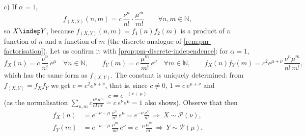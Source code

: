 \begin{example}
c) If $\alpha=1$,
\[
  f_{(X,Y)}(n,m)=c\,\frac{\nu^n}{n!}\cdot\frac{\mu^m}{m!}\qquad\forall n,m\in\mathbb N,
\]
so $X\indep Y$, because $f_{(X,Y)}(n,m)=f_1(n)f_2(m)$ is a product of a function of $n$ and a
function of $m$ (the discrete analogue of \cref{rem:pm-factorisation}). Let us confirm it with
\cref{prop:pm-discrete-independence}: for $\alpha=1$,
\[
  f_X(n)=c\,\frac{\nu^n}{n!}\,e^{\mu}\quad\forall n\in\mathbb N,\qquad
  f_Y(m)=c\,\frac{\mu^m}{m!}\,e^{\nu}\quad\forall m\in\mathbb N,\qquad
  f_X(n)f_Y(m)=c^2e^{\mu+\nu}\,\frac{\nu^n\mu^m}{n!\,m!},
\]
which has the same form as $f_{(X,Y)}$. The constant is uniquely determined: from
$f_{(X,Y)}=f_Xf_Y$ we get $c=c^2e^{\mu+\nu}$, that is, since $c\ne0$, $1=c\,e^{\mu+\nu}$ and
\[
  c=e^{-(\nu+\mu)}
\]
(as the normalisation $\sum_{n,m}c\frac{\nu^n\mu^m}{n!\,m!}=c\,e^\nu e^\mu=1$ also shows).
Observe that then
\[
\begin{aligned}
  f_X(n)&=e^{-\nu-\mu}\,\frac{\nu^n}{n!}\,e^{\mu}=e^{-\nu}\frac{\nu^n}{n!}\ \Longrightarrow\ X\sim\mathcal P(\nu),\\
  f_Y(m)&=e^{-\nu-\mu}\,\frac{\mu^m}{m!}\,e^{\nu}=e^{-\mu}\frac{\mu^m}{m!}\ \Longrightarrow\ Y\sim\mathcal P(\mu).
\end{aligned}
\]
\end{example}

